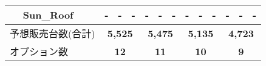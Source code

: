 \begin{table*}[t]
\begin{tabular}{l|l|c|c|c||c|c|c||c|c|c||c|c|c}
       & \textsf{Sun\_Roof} & \textsf{-} & \textsf{-} & \textsf{-} & \textsf{-} & \textsf{-} & \textsf{-} & \textsf{-} & \textsf{-} & \textsf{-} & \textsf{-} & \textsf{-} & \textsf{-} \\ \hline
   \multicolumn{2}{l|}{予想販売台数(合計)}  & \multicolumn{3}{c||}{\bf 5,525} & \multicolumn{3}{c||}{\bf 5,475} & \multicolumn{3}{c||}{\bf 5,135} & \multicolumn{3}{c}{\bf 4,723} \\ 
   \multicolumn{2}{l|}{オプション数} & \multicolumn{3}{c||}{\bf 12} & \multicolumn{3}{c||}{\bf 11} & \multicolumn{3}{c||}{\bf 10} & \multicolumn{3}{c}{\bf 9} \\ \hline
  \end{tabular}
 \label{tab:prt_ans}
\end{table*}
